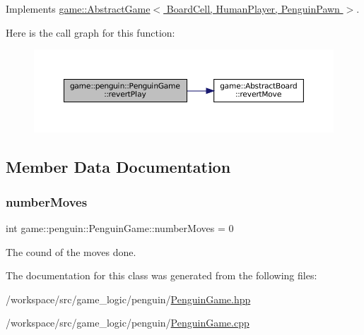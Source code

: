 Implements \hyperlink{classgame_1_1_abstract_game_af6088ae12ed47989dde7f8869e79d934}{game\+::\+Abstract\+Game$<$ Board\+Cell, Human\+Player, Penguin\+Pawn $>$}.

Here is the call graph for this function\+:
\nopagebreak
\begin{figure}[H]
\begin{center}
\leavevmode
\includegraphics[width=350pt]{classgame_1_1penguin_1_1_penguin_game_a16aabdfdf43ad7b5b417b58eb593e063_cgraph}
\end{center}
\end{figure}


\subsection{Member Data Documentation}
\mbox{\label{classgame_1_1penguin_1_1_penguin_game_a52d749e098b76c888b9891f339b22f81}} 
\subsubsection{\texorpdfstring{number\+Moves}{numberMoves}}
{\footnotesize\ttfamily int game\+::penguin\+::\+Penguin\+Game\+::number\+Moves = 0\hspace{0.3cm}{\ttfamily [protected]}}



The cound of the moves done. 



The documentation for this class was generated from the following files\+:\begin{DoxyCompactItemize}
\item 
/workspace/src/game\+\_\+logic/penguin/\hyperlink{_penguin_game_8hpp}{Penguin\+Game.\+hpp}\item 
/workspace/src/game\+\_\+logic/penguin/\hyperlink{_penguin_game_8cpp}{Penguin\+Game.\+cpp}\end{DoxyCompactItemize}
